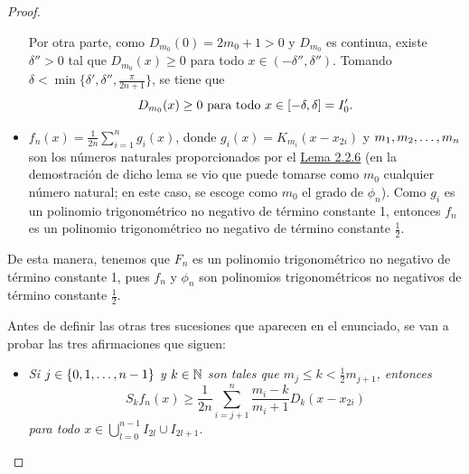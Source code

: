\documentclass[a4paper, 12pt, oneside]{book}
\begin{document}
\begin{proof}
\begin{itemize}
        Por otra parte, como $D_{m_0}(0) = 2m_0+1 > 0$ y $D_{m_0}$ es continua, existe $\delta'' > 0$ tal que $D_{m_0}(x) \geq 0$ para todo $x \in (-\delta'',\delta'')$. Tomando $\delta < \min\{\delta',\delta'',\frac{\pi}{2n+1}\}$, se tiene que
        \begin{equation}\label{2.2.9}
            D_{m_0}(x) \geq 0 \textup{ para todo } x \in [-\delta,\delta] = I_0'.
        \end{equation}
        \item $f_n(x) = \frac{1}{2n}\sum_{i=1}^n g_i(x)$, donde $g_i(x)= K_{m_i}(x-x_{2i})$ y $m_1,m_2,\mathellipsis,m_n$ son los números naturales proporcionados por el \hyperref[2.2.6]{\color{blue}Lema 2.2.6} (en la demostración de dicho lema se vio que puede tomarse como $m_0$ cualquier número natural; en este caso, se escoge como $m_0$ el grado de $\phi_n$). Como $g_i$ es un polinomio trigonométrico no negativo de término constante 1, entonces $f_n$ es un polinomio trigonométrico no negativo de término constante $\frac{1}{2}$.
    \end{itemize}

    De esta manera, tenemos que $F_n$ es un polinomio trigonométrico no negativo de término constante 1, pues $f_n$ y $\phi_n$ son polinomios trigonométricos no negativos de término constante $\frac{1}{2}$.

    Antes de definir las otras tres sucesiones que aparecen en el enunciado, se van a probar las tres afirmaciones que siguen:

    \begin{itemize}
        \item \textit{Si $j \in \{0,1,\mathellipsis,n-1\}$ y $k \in \mathbb N$ son tales que $m_j \leq k < \frac{1}{2}m_{j+1}$, entonces
        \begin{equation}\label{2.2.12}
            S_kf_n(x) \geq \frac{1}{2n}\sum_{i=j+1}^n \frac{m_i-k}{m_i+1}D_k(x-x_{2i})
        \end{equation}
        para todo $x \in \bigcup_{l=0}^{n-1}I_{2l}\cup I_{2l+1}$.}


\end{itemize}
\end{proof}
\end{document}

